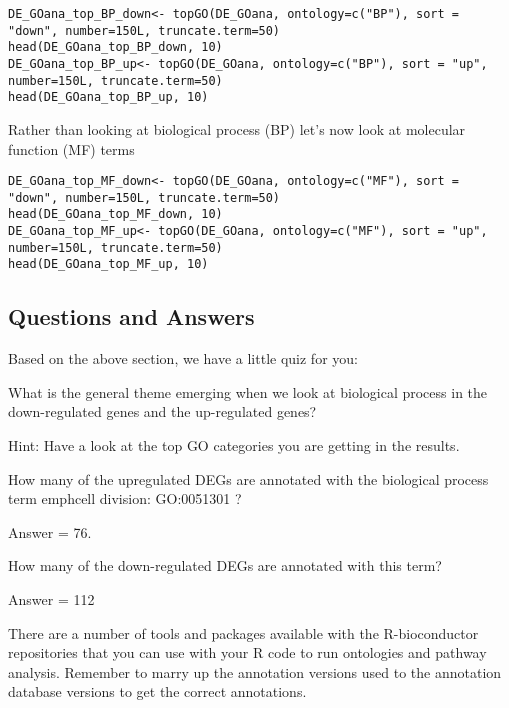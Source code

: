 \begin{steps}
\begin{lstlisting}
DE_GOana_top_BP_down<- topGO(DE_GOana, ontology=c("BP"), sort = "down", number=150L, truncate.term=50)
head(DE_GOana_top_BP_down, 10)
DE_GOana_top_BP_up<- topGO(DE_GOana, ontology=c("BP"), sort = "up", number=150L, truncate.term=50)
head(DE_GOana_top_BP_up, 10)
\end{lstlisting}
\end{steps}

Rather than looking at biological process (BP) let's now look at molecular function (MF) terms

\begin{steps}
\begin{lstlisting}
DE_GOana_top_MF_down<- topGO(DE_GOana, ontology=c("MF"), sort = "down", number=150L, truncate.term=50)
head(DE_GOana_top_MF_down, 10)
DE_GOana_top_MF_up<- topGO(DE_GOana, ontology=c("MF"), sort = "up", number=150L, truncate.term=50)
head(DE_GOana_top_MF_up, 10)
\end{lstlisting}
\end{steps}

\subsection{Questions and Answers}
Based on the above section, we have a little quiz for you:


\begin{questions}
What is the general theme emerging when we look at biological process in the down-regulated genes and the up-regulated genes?
\begin{answer}
Hint: Have a look at the top GO categories you are getting in the results. 
\end{answer}

How many of the upregulated DEGs are annotated with the biological process term emph{cell division: GO:0051301} ? 
\begin{answer}
Answer = 76. 
\end{answer}
How many of the down-regulated DEGs are annotated with this term? 
\begin{answer}
Answer = 112
\end{answer}
\end{questions}

\begin{note}There are a number of tools and packages available with the R-bioconductor repositories that you can use with your R code to run ontologies and pathway analysis. Remember to marry up the annotation versions used to the annotation database versions to get the correct annotations.
\end{note}

